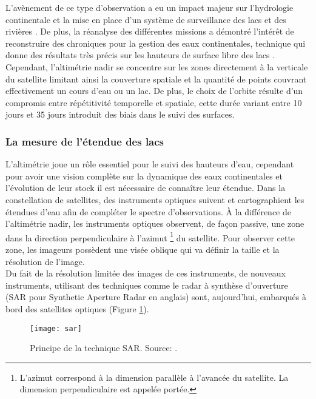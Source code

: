 L'avènement de ce type d'observation a eu un impact majeur sur l'hydrologie continentale et la mise en place d'un système de surveillance des lacs \citep{birkett1995} et des rivières \citep{birkett1998,kouraev2004}. De plus, la réanalyse des différentes missions a démontré l'intérêt de reconstruire des chroniques pour la gestion des eaux continentales, technique qui donne des résultats très précis sur les hauteurs de surface libre des lacs \citep{berry2005}. \\
Cependant, l'altimétrie nadir se concentre sur les zones directement à la verticale du satellite limitant ainsi la couverture spatiale et la quantité de points couvrant effectivement un cours d'eau ou un lac. De plus, le choix de l'orbite résulte d'un compromis entre répétitivité temporelle et spatiale, cette durée variant entre 10 jours et 35 jours introduit des biais dans le suivi des surfaces.

\subsubsection{{\selectfont La mesure de l'étendue des lacs}}

L'altimétrie joue un rôle essentiel pour le suivi des hauteurs d'eau, cependant pour avoir une vision complète sur la dynamique des eaux continentales et l'évolution de leur stock il est nécessaire de connaître leur étendue. Dans la constellation de satellites, des instruments optiques suivent et cartographient les étendues d'eau afin de compléter le spectre d'observations. À la différence de l'altimétrie nadir, les instruments optiques observent, de façon passive, une zone dans la direction perpendiculaire à l'azimut \footnote{L'azimut correspond à la dimension parallèle à l'avancée du satellite. La dimension perpendiculaire est appelée portée.} du satellite. Pour observer cette zone, les imageurs possèdent une visée oblique qui va définir la taille et la résolution de l'image. \\
Du fait de la  résolution limitée des images de ces instruments, de nouveaux instruments, utilisant des techniques comme le radar à synthèse d'ouverture (SAR pour Synthetic Aperture Radar en anglais) sont, aujourd'hui, embarqués à bord des satellites optiques (Figure \ref{sar}).\\

\begin{figure}[h!]
 \centerline{\texttt{[image: sar]}}
 \caption{Principe de la technique SAR. Source: \citet{calmant2008}.}
 \label{sar}
\end{figure}

